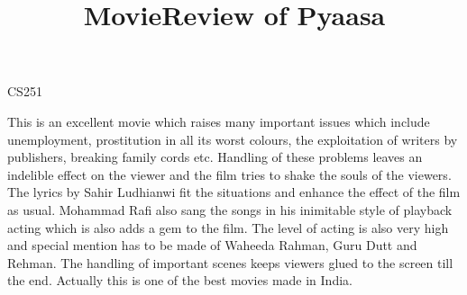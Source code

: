 \documentclass{article}
\begin{document}
\title{MovieReview of Pyaasa}


\centerline{\sc \large CS251}
\vspace{.5pc}
\centerline{\sc }
\vspace{2pc}

This is an excellent movie which raises many important issues which include unemployment, prostitution in all its worst colours, the exploitation of writers by publishers, breaking family cords etc. Handling of these problems leaves an indelible effect on the viewer and the film tries to shake the souls of the viewers. The lyrics by Sahir Ludhianwi fit the situations and enhance the effect of the film as usual. Mohammad Rafi also sang the songs in his inimitable style of playback acting which is also adds a gem to the film. The level of acting is also very high and special mention has to be made of Waheeda Rahman, Guru Dutt and Rehman. The handling of important scenes keeps viewers glued to the screen till the end. Actually this is one of the best movies made in India. 
\end{document}
